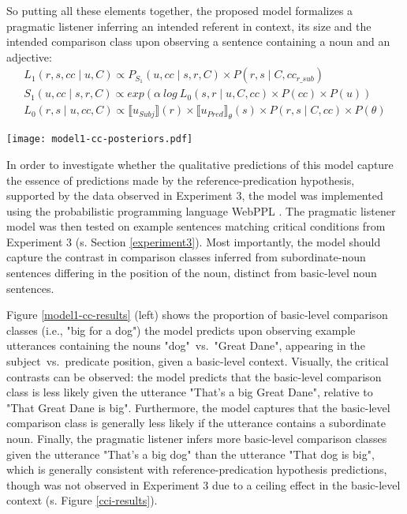 So putting all these elements together, the proposed model formalizes a pragmatic listener inferring an intended referent in context, its size and the intended comparison class upon observing a sentence containing a noun and an adjective:
\begin{gather*}
	L_1 (r, s, cc \mid u, C) \propto P_{S_1} (u, cc \mid s, r, C) \times P(r, s \mid C, cc_{r\_sub}) \\
	S_1 (u, cc \mid s, r, C)  \propto exp(\alpha \: log \: L_0 (s, r \mid u, C, cc) \times P(cc) \times P(u)) \\
	L_0 (r, s \mid u, cc, C) \propto \llbracket u_{Subj} \rrbracket (r)  \times  \llbracket u_{Pred} \rrbracket_{\theta} (s) \times P(r, s \mid C, cc) \times P(\theta)
\end{gather*}
 
\begin{figure*}[t]
 	\begin{center}
 		\texttt{[image: model1-cc-posteriors.pdf]}
 	\end{center}
 	\vspace{-0.3cm}
 	\caption{Qualitative predictions made by the refpred-RSA model: Pragmatic listener inferences are plotted in terms of the probability to use the basic-level comparison class (i.e., "big for a dog"), given utterances differing in the noun and its position, presented in a basic-level context (left)~vs.~subordinate context (right). Qualitatively, the crucial noun$\times$syntax interaction can be observed. Note the different y-axis scaling.}
 	\label{model1-cc-results}
 \end{figure*}
In order to investigate whether the qualitative predictions of this model capture the essence of predictions made by the reference-predication hypothesis, supported by the data observed in Experiment 3, the model was implemented using the probabilistic programming language WebPPL \parencite{dippl}. The pragmatic listener model was then tested on example sentences matching critical conditions from Experiment 3 (s. Section \ref{experiment3}). Most importantly, the model should capture the contrast in comparison classes inferred from subordinate-noun sentences differing in the position of the noun, distinct from basic-level noun sentences.

Figure \ref{model1-cc-results} (left) shows the proportion of basic-level comparison classes (i.e., "big for a dog") the model predicts upon observing example utterances containing the nouns "dog"~vs.~"Great Dane", appearing in the subject~vs.~predicate position, given a basic-level context. 
Visually, the critical contrasts can be observed: the model predicts that the basic-level comparison class is less likely given the utterance "That's a big Great Dane", relative to "That Great Dane is big". Furthermore, the model captures that the basic-level comparison class is generally less likely if the utterance contains a subordinate noun. Finally, the pragmatic listener infers more basic-level comparison classes given the utterance "That's a big dog" than the utterance "That dog is big", which is generally consistent with reference-predication hypothesis predictions, though was not observed in Experiment 3 due to a ceiling effect in the basic-level context (s. Figure \ref{cci-results}). 

